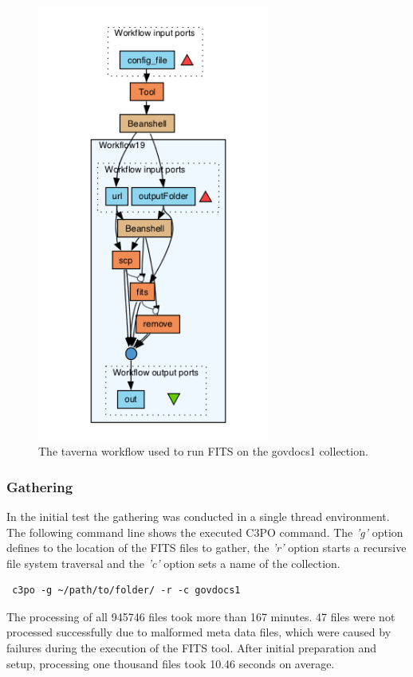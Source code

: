 \begin{figure}[h]
\begin{center}
\includegraphics[width=3in]{figures/usecases/taverna_workflow.png}
\caption{The taverna workflow used to run FITS on the govdocs1 collection.}
\label{fig:taverna_workflow}
\end{center}
\end{figure}

\clearpage

\subsubsection{Gathering}
In the initial test the gathering was conducted in a single thread environment. The following command line shows the executed C3PO command. The \textit{'g'} option defines to the location of the FITS files to gather, the \textit{'r'} option starts a recursive file system traversal and the \textit{'c'} option sets a name of the collection.

\begin{verbatim}
 c3po -g ~/path/to/folder/ -r -c govdocs1
\end{verbatim}

The processing of all 945746 files took more than 167 minutes.
47 files were not processed successfully due to malformed meta data files, which were caused by failures during the execution of the FITS tool.
After initial preparation and setup, processing one thousand files took 10.46 seconds on average.

